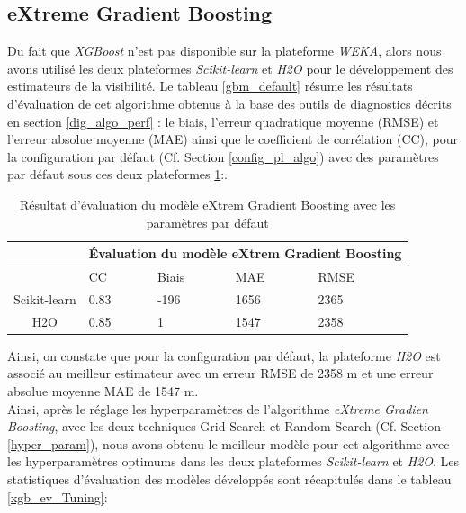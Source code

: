\subsection*{eXtreme Gradient Boosting}
Du fait que \textit{XGBoost} n'est pas disponible sur la plateforme \textit{WEKA}, alors nous avons utilisé les deux plateformes \textit{Scikit-learn} et \textit{H2O} pour le développement des estimateurs de la visibilité. Le tableau \ref{gbm_default} résume les résultats d'évaluation de cet algorithme obtenus à la base des outils de diagnostics décrits en section \ref{dig_algo_perf} : le biais, l'erreur quadratique moyenne (RMSE) et l'erreur absolue moyenne (MAE) ainsi que le coefficient de corrélation (CC), pour la configuration par défaut (Cf. Section \ref{config_pl_algo}) avec des paramètres par défaut sous ces deux plateformes \ref{xgb_default}:.\\

\begin{table}[!ht]
    \centering
    \begin{tabular}{ |c|p{2cm}|p{2cm}|p{2cm}|p{2cm}|  }
     \hline
     & \multicolumn{4}{|c|}{Évaluation du modèle eXtrem Gradient Boosting} \\
     \hline
     & CC & Biais & MAE & RMSE\\
     \hline
     Scikit-learn & 0.83 & -196 & 1656 & 2365\\
     \hline
     H2O & 0.85 & 1 & 1547 & 2358 \\
     \hline
    \end{tabular}
    \caption{Résultat d'évaluation du modèle eXtrem Gradient Boosting avec les paramètres par défaut}
    \label{xgb_default}
\end{table}

Ainsi, on constate que pour la configuration par défaut, la plateforme \textit{H2O} est associé au meilleur estimateur avec un erreur RMSE de 2358 m et une erreur absolue moyenne MAE de 1547 m. \\

Ainsi, après le réglage les hyperparamètres de l'algorithme \textit{eXtreme Gradien Boosting}, avec les deux techniques Grid Search et Random Search (Cf. Section \ref{hyper_param}), nous avons obtenu le meilleur modèle pour cet algorithme avec les hyperparamètres optimums dans les deux plateformes \textit{Scikit-learn} et \textit{H2O}. Les statistiques d'évaluation des modèles développés sont récapitulés dans le tableau \ref{xgb_ev_Tuning}:\\

